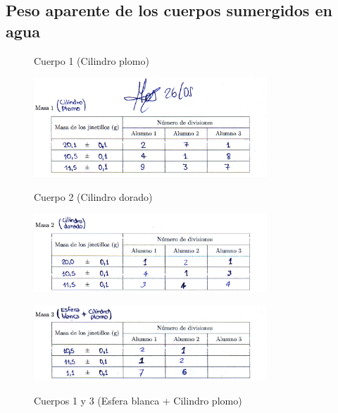 \documentclass[10pt]{article}
\begin{document}
\vspace{-0.8cm}

\subsection{Peso aparente de los cuerpos sumergidos en agua}
\vspace{-0.1cm}
\begin{figure}[H]
    \begin{center}
        \caption{Cuerpo 1 (Cilindro plomo)}  {\label{fig:plomo en agua}} 
        \vspace{-0.3cm}
        \includegraphics[width = 0.78\textwidth]{Imagenes/Peso Aparente 1.png}
        
        \vspace{0.4cm}
        \caption{Cuerpo 2 (Cilindro dorado)}  {\label{fig:laton en agua}} 
        \vspace{-0.3cm}
        \includegraphics[width = 0.78\textwidth]{Imagenes/Peso Aparente 2.png}
        
        \vspace{0.5cm}
        \caption{Cuerpos 1 y 3 (Esfera blanca + Cilindro plomo)}  {\label{fig:blanco y plomo en agua}}
        \vspace{-0.1cm}
        \includegraphics[width = 0.78\textwidth]{Imagenes/Peso Aparente 3.png}
    \end{center}
\end{figure}
\end{document}
